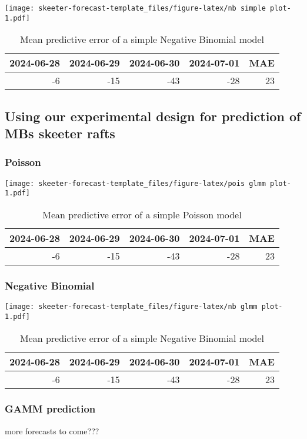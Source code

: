 \documentclass[
]{article}
\begin{document}
\texttt{[image: skeeter-forecast-template\_files/figure-latex/nb simple plot-1.pdf]}

\begin{longtable}[t]{rrrrr}
\caption{\label{tab:nb simple accuracy}Mean predictive error of a simple Negative Binomial model}\\
\toprule
2024-06-28 & 2024-06-29 & 2024-06-30 & 2024-07-01 & MAE\\
\midrule
-6 & -15 & -43 & -28 & 23\\
\bottomrule
\end{longtable}

\subsection{Using our experimental design for prediction of MBs skeeter
rafts}\label{using-our-experimental-design-for-prediction-of-mbs-skeeter-rafts}

\subsubsection{Poisson}\label{poisson-1}

\texttt{[image: skeeter-forecast-template\_files/figure-latex/pois glmm plot-1.pdf]}

\begin{longtable}[t]{rrrrr}
\caption{\label{tab:pois glmm accuracy}Mean predictive error of a simple Poisson model}\\
\toprule
2024-06-28 & 2024-06-29 & 2024-06-30 & 2024-07-01 & MAE\\
\midrule
-6 & -15 & -43 & -28 & 23\\
\bottomrule
\end{longtable}

\subsubsection{Negative Binomial}\label{negative-binomial-1}

\texttt{[image: skeeter-forecast-template\_files/figure-latex/nb glmm plot-1.pdf]}

\begin{longtable}[t]{rrrrr}
\caption{\label{tab:nb glmm accuracy}Mean predictive error of a simple Negative Binomial model}\\
\toprule
2024-06-28 & 2024-06-29 & 2024-06-30 & 2024-07-01 & MAE\\
\midrule
-6 & -15 & -43 & -28 & 23\\
\bottomrule
\end{longtable}

\subsubsection{GAMM prediction}\label{gamm-prediction}

more forecasts to come???
\end{document}
